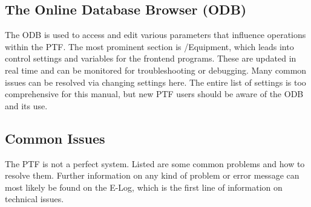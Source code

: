 \documentclass[twoside,letterpaper]{refart}
\begin{document}
\subsection{The Online Database Browser (ODB)}

The ODB is used to access and edit various parameters that influence operations within the PTF. The most prominent section is /Equipment, which leads into control settings and variables for the frontend programs. These are updated in real time and can be monitored for troubleshooting or debugging. Many common issues can be resolved via changing settings here. The entire list of settings is too comprehensive for this manual, but new PTF users should be aware of the ODB and its use.

\subsection{Common Issues}

The PTF is not a perfect system. Listed are some common problems and how to resolve them. Further information on any kind of problem or error message can most likely be found on the E-Log, which is the first line of information on technical issues.
\end{document}
